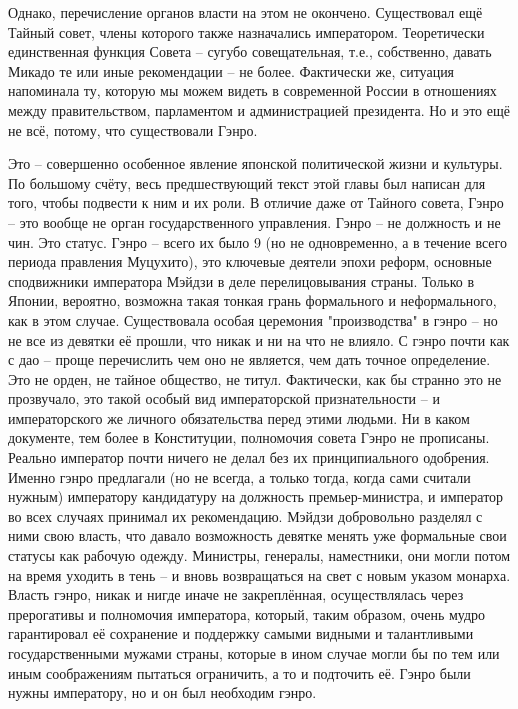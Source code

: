Однако, перечисление органов власти на этом не окончено. Существовал ещё Тайный совет, члены которого также назначались императором. Теоретически единственная функция Совета – сугубо совещательная, т.е., собственно, давать Микадо те или иные рекомендации – не более. Фактически же, ситуация напоминала ту, которую мы можем видеть в современной России в отношениях между правительством, парламентом и администрацией президента. Но и это ещё не всё, потому, что существовали Гэнро.

Это – совершенно особенное явление японской политической жизни и культуры. По большому счёту, весь предшествующий текст этой главы был написан для того, чтобы подвести к ним и их роли. В отличие даже от Тайного совета, Гэнро – это вообще не орган государственного управления. Гэнро – не должность и не чин. Это статус. Гэнро – всего их было 9 (но не одновременно, а в течение всего периода правления Муцухито), это ключевые деятели эпохи реформ, основные сподвижники императора Мэйдзи в деле перелицовывания страны. Только в Японии, вероятно, возможна такая тонкая грань формального и неформального, как в этом случае. Существовала особая церемония "производства" в гэнро – но не все из девятки её прошли, что никак и ни на что не влияло. С гэнро почти как с дао – проще перечислить чем оно не является, чем дать точное определение. Это не орден, не тайное общество, не титул. Фактически, как бы странно это не прозвучало, это такой особый вид императорской признательности – и императорского же личного обязательства перед этими людьми. Ни в каком документе, тем более в Конституции, полномочия совета Гэнро не прописаны. Реально император почти ничего не делал без их принципиального одобрения. Именно гэнро предлагали (но не всегда, а только тогда, когда сами считали нужным) императору кандидатуру на должность премьер-министра, и император во всех случаях принимал их рекомендацию. Мэйдзи добровольно разделял с ними свою власть, что давало возможность девятке менять уже формальные свои статусы как рабочую одежду. Министры, генералы, наместники, они могли потом на время уходить в тень – и вновь возвращаться на свет с новым указом монарха. Власть гэнро, никак и нигде иначе не закреплённая, осуществлялась через прерогативы и полномочия императора, который, таким образом, очень мудро гарантировал её сохранение и поддержку самыми видными и талантливыми государственными мужами страны, которые в ином случае могли бы по тем или иным соображениям пытаться ограничить, а то и подточить её. Гэнро были нужны императору, но и он был необходим гэнро.

